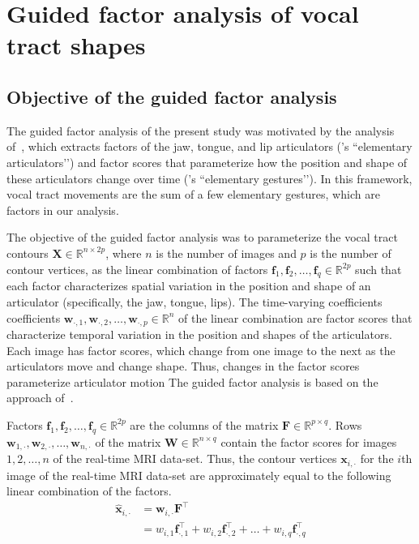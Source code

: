 \documentclass[reprint]{JASAnew}\usepackage[]{graphicx}\usepackage[]{color}
\begin{document}
\section{Guided factor analysis of vocal tract shapes}
\label{sec:gfa}




\subsection{Objective of the guided factor analysis}
\label{subsec:objectivesoftheguidedfactoranalysis}

The guided factor analysis of the present study was motivated by the analysis of~\citet{maeda1990compensatory}, which extracts factors of the jaw, tongue, and lip articulators (\citeauthor{maeda1990compensatory}’s ``elementary articulators’’) and factor scores that parameterize how the position and shape of these articulators change over time (\citeauthor{maeda1990compensatory}’s ``elementary gestures’’). In this framework, vocal tract movements are the sum of a few elementary gestures, which are factors in our analysis. 

The objective of the guided factor analysis was to parameterize the vocal tract contours $\mathbf{X} \in \mathbb{R}^{n\times 2p}$, where $n$ is the number of images and $p$ is the number of contour vertices, as the linear combination of factors $\mathbf{f}_1, \mathbf{f}_2, \ldots, \mathbf{f}_q \in \mathbb{R}^{2p}$ such that each factor characterizes spatial variation in the position and shape of an articulator (specifically, the jaw, tongue, lips). 
%
The time-varying coefficients coefficients $\mathbf{w}_{\cdot,1},\mathbf{w}_{\cdot,2},\ldots,\mathbf{w}_{\cdot,p} \in \mathbb{R}^n$ of the linear combination are factor scores that characterize temporal variation in the position and shapes of the articulators. Each image has factor scores, which change from one image to the next as the articulators move and change shape. Thus, changes in the factor scores parameterize articulator motion
%
The guided factor analysis is based on the approach of~\citet{toutios2015factor}.


Factors $\mathbf{f}_1, \mathbf{f}_2, \ldots, \mathbf{f}_q \in \mathbb{R}^{2p}$ are the columns of the matrix $\mathbf{F} \in \mathbb{R}^{p\times q}$. 
%
Rows $\mathbf{w}_{1,\cdot},\mathbf{w}_{2,\cdot},\ldots,\mathbf{w}_{n,\cdot}$ of the matrix $\mathbf{W} \in \mathbb{R}^{n\times q}$ contain the factor scores for images $1,2,\ldots,n$ of the real-time MRI data-set. 
%
Thus, the contour vertices $\mathbf{x}_{i,\cdot}$ for the $i$th image of the real-time MRI data-set are approximately equal to the following linear combination of the factors. 
%
\begin{align}
\label{eq:linearcombo}
\mathbf{\hat{x}}_{i,\cdot}
 &=
  \mathbf{w}_{i,\cdot} \mathbf{F}^\intercal \\
 &=
  w_{i,1} \mathbf{f}_{\cdot,1}^\intercal
  + w_{i,2} \mathbf{f}_{\cdot,2}^\intercal
  + \ldots
  + w_{i,q} \mathbf{f}_{\cdot,q}^\intercal
\end{align}
\end{document}
